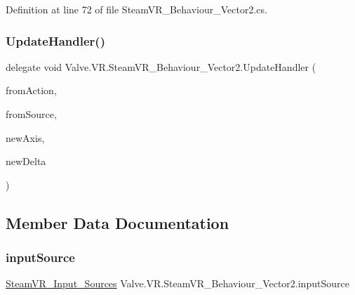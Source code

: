 Definition at line 72 of file Steam\+V\+R\+\_\+\+Behaviour\+\_\+\+Vector2.\+cs.

\mbox{\label{class_valve_1_1_v_r_1_1_steam_v_r___behaviour___vector2_a234f522c6df42a17b1f11cf8e9556ada}} 
\subsubsection{\texorpdfstring{UpdateHandler()}{UpdateHandler()}}
{\footnotesize\ttfamily delegate void Valve.\+V\+R.\+Steam\+V\+R\+\_\+\+Behaviour\+\_\+\+Vector2.\+Update\+Handler (\begin{DoxyParamCaption}\item[{\mbox{\hyperlink{class_valve_1_1_v_r_1_1_steam_v_r___behaviour___vector2}{Steam\+V\+R\+\_\+\+Behaviour\+\_\+\+Vector2}}}]{from\+Action,  }\item[{\mbox{\hyperlink{namespace_valve_1_1_v_r_a82e5bf501cc3aa155444ee3f0662853f}{Steam\+V\+R\+\_\+\+Input\+\_\+\+Sources}}}]{from\+Source,  }\item[{Vector2}]{new\+Axis,  }\item[{Vector2}]{new\+Delta }\end{DoxyParamCaption})}



\subsection{Member Data Documentation}
\mbox{\label{class_valve_1_1_v_r_1_1_steam_v_r___behaviour___vector2_a00cd7447959f673d44896e7d11abcfc2}} 
\subsubsection{\texorpdfstring{inputSource}{inputSource}}
{\footnotesize\ttfamily \mbox{\hyperlink{namespace_valve_1_1_v_r_a82e5bf501cc3aa155444ee3f0662853f}{Steam\+V\+R\+\_\+\+Input\+\_\+\+Sources}} Valve.\+V\+R.\+Steam\+V\+R\+\_\+\+Behaviour\+\_\+\+Vector2.\+input\+Source}



